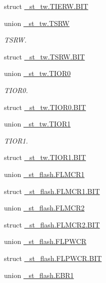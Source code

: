 \begin{DoxyCompactItemize}
struct \hyperlink{3694s_8h_db/d82/struct__st__tw_8TIERW_8BIT}{\+\_\+st\+\_\+tw.\+T\+I\+E\+R\+W.\+B\+I\+T}
\item 
union \hyperlink{3694s_8h_de/d76/union__st__tw_8TSRW}{\+\_\+st\+\_\+tw.\+T\+S\+R\+W}
\begin{DoxyCompactList}\small\item\em T\+S\+R\+W. \end{DoxyCompactList}\item 
struct \hyperlink{3694s_8h_d4/dbc/struct__st__tw_8TSRW_8BIT}{\+\_\+st\+\_\+tw.\+T\+S\+R\+W.\+B\+I\+T}
\item 
union \hyperlink{3694s_8h_d7/de2/union__st__tw_8TIOR0}{\+\_\+st\+\_\+tw.\+T\+I\+O\+R0}
\begin{DoxyCompactList}\small\item\em T\+I\+O\+R0. \end{DoxyCompactList}\item 
struct \hyperlink{3694s_8h_dd/d1f/struct__st__tw_8TIOR0_8BIT}{\+\_\+st\+\_\+tw.\+T\+I\+O\+R0.\+B\+I\+T}
\item 
union \hyperlink{3694s_8h_d6/dce/union__st__tw_8TIOR1}{\+\_\+st\+\_\+tw.\+T\+I\+O\+R1}
\begin{DoxyCompactList}\small\item\em T\+I\+O\+R1. \end{DoxyCompactList}\item 
struct \hyperlink{3694s_8h_d7/dd2/struct__st__tw_8TIOR1_8BIT}{\+\_\+st\+\_\+tw.\+T\+I\+O\+R1.\+B\+I\+T}
\item 
union \hyperlink{3694s_8h_de/dc4/union__st__flash_8FLMCR1}{\+\_\+st\+\_\+flash.\+F\+L\+M\+C\+R1}
\item 
struct \hyperlink{3694s_8h_dd/d09/struct__st__flash_8FLMCR1_8BIT}{\+\_\+st\+\_\+flash.\+F\+L\+M\+C\+R1.\+B\+I\+T}
\item 
union \hyperlink{3694s_8h_d9/da0/union__st__flash_8FLMCR2}{\+\_\+st\+\_\+flash.\+F\+L\+M\+C\+R2}
\item 
struct \hyperlink{3694s_8h_d1/d7a/struct__st__flash_8FLMCR2_8BIT}{\+\_\+st\+\_\+flash.\+F\+L\+M\+C\+R2.\+B\+I\+T}
\item 
union \hyperlink{3694s_8h_d9/dfc/union__st__flash_8FLPWCR}{\+\_\+st\+\_\+flash.\+F\+L\+P\+W\+C\+R}
\item 
struct \hyperlink{3694s_8h_d1/d39/struct__st__flash_8FLPWCR_8BIT}{\+\_\+st\+\_\+flash.\+F\+L\+P\+W\+C\+R.\+B\+I\+T}
\item 
union \hyperlink{3694s_8h_d8/d9e/union__st__flash_8EBR1}{\+\_\+st\+\_\+flash.\+E\+B\+R1}
\item 

\end{DoxyCompactItemize}
